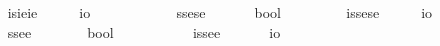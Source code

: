 \begin{isabellebody}
\ \ \isamarkupfalse%
\ isieie\ {\isacharequal}\ \ \ \ \ {\isachardoublequoteopen}{\isacharparenleft}{\isasymup}{\isasymzero}{\isasymRightarrow}{\isasymup}{\isasymzero}{\isasymRightarrow}io{\isacharparenright}{\isachardoublequoteclose}\ \ \ \ \ \ \ \ {\isacharparenleft}{\isachardoublequoteopen}{\isasymup}{\isasymlangle}{\isasymup}{\isasymzero}{\isacharcomma}{\isasymup}{\isasymzero}{\isasymrangle}{\isachardoublequoteclose}{\isacharparenright}\isanewline
\ \ \isamarkupfalse%
\ ssese\ {\isacharequal}\ \ \ \ \ \ {\isachardoublequoteopen}{\isacharparenleft}{\isasymlangle}{\isasymzero}{\isasymrangle}{\isasymRightarrow}{\isasymlangle}{\isasymzero}{\isasymrangle}{\isasymRightarrow}bool{\isacharparenright}{\isachardoublequoteclose}\ \ \ \ \ {\isacharparenleft}{\isachardoublequoteopen}{\isasymlangle}{\isasymlangle}{\isasymzero}{\isasymrangle}{\isacharcomma}{\isasymlangle}{\isasymzero}{\isasymrangle}{\isasymrangle}{\isachardoublequoteclose}{\isacharparenright}\isanewline
\ \ \isamarkupfalse%
\ issese\ {\isacharequal}\ \ \ \ \ {\isachardoublequoteopen}{\isacharparenleft}{\isasymlangle}{\isasymzero}{\isasymrangle}{\isasymRightarrow}{\isasymlangle}{\isasymzero}{\isasymrangle}{\isasymRightarrow}io{\isacharparenright}{\isachardoublequoteclose}\ \ \ \ \ \ {\isacharparenleft}{\isachardoublequoteopen}{\isasymup}{\isasymlangle}{\isasymlangle}{\isasymzero}{\isasymrangle}{\isacharcomma}{\isasymlangle}{\isasymzero}{\isasymrangle}{\isasymrangle}{\isachardoublequoteclose}{\isacharparenright}\isanewline
\ \ \isamarkupfalse%
\ ssee\ {\isacharequal}\ \ \ \ \ \ \ {\isachardoublequoteopen}{\isacharparenleft}{\isasymlangle}{\isasymzero}{\isasymrangle}{\isasymRightarrow}{\isasymzero}{\isasymRightarrow}bool{\isacharparenright}{\isachardoublequoteclose}\ \ \ \ \ \ \ {\isacharparenleft}{\isachardoublequoteopen}{\isasymlangle}{\isasymlangle}{\isasymzero}{\isasymrangle}{\isacharcomma}{\isasymzero}{\isasymrangle}{\isachardoublequoteclose}{\isacharparenright}\isanewline
\ \ \isamarkupfalse%
\ issee\ {\isacharequal}\ \ \ \ \ \ {\isachardoublequoteopen}{\isacharparenleft}{\isasymlangle}{\isasymzero}{\isasymrangle}{\isasymRightarrow}{\isasymzero}{\isasymRightarrow}io{\isacharparenright}{\isachardoublequoteclose}\ \ \ \ \ \ \ \ {\isacharparenleft}{\isachardoublequoteopen}{\isasymup}{\isasymlangle}{\isasymlangle}{\isasymzero}{\isasymrangle}{\isacharcomma}{\isasymzero}{\isasymrangle}{\isachardoublequoteclose}{\isacharparenright}\isanewline

\end{isabellebody}
